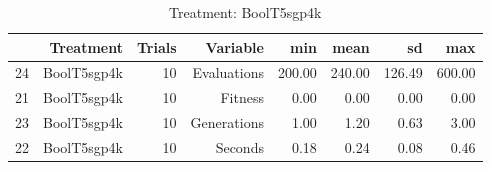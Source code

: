 \begin{table}[ht]
\centering
\begin{tabular}{rrrrrrrr}
  \hline
 & Treatment & Trials & Variable & min & mean & sd & max \\ 
  \hline
24 & BoolT5sgp4k &  10 & Evaluations & 200.00 & 240.00 & 126.49 & 600.00 \\ 
  21 & BoolT5sgp4k &  10 & Fitness & 0.00 & 0.00 & 0.00 & 0.00 \\ 
  23 & BoolT5sgp4k &  10 & Generations & 1.00 & 1.20 & 0.63 & 3.00 \\ 
  22 & BoolT5sgp4k &  10 & Seconds & 0.18 & 0.24 & 0.08 & 0.46 \\ 
   \hline
\end{tabular}
\caption{Treatment: BoolT5sgp4k} 
\end{table}
